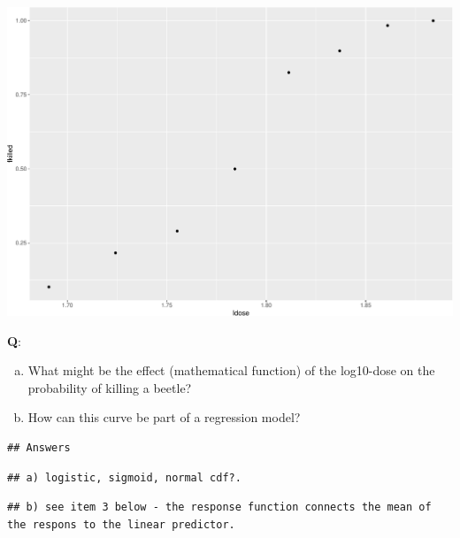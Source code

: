\documentclass[
  ignorenonframetext,
]{beamer}
\newenvironment{Shaded}{\begin{snugshade}}{\end{snugshade}}
\newcommand{\AttributeTok}[1]{\textcolor[rgb]{0.13,0.29,0.53}{#1}}
\newcommand{\CommentTok}[1]{\textcolor[rgb]{0.56,0.35,0.01}{\textit{#1}}}
\newcommand{\FunctionTok}[1]{\textcolor[rgb]{0.13,0.29,0.53}{\textbf{#1}}}
\newcommand{\NormalTok}[1]{#1}
\newcommand{\OtherTok}[1]{\textcolor[rgb]{0.56,0.35,0.01}{#1}}
\newcommand{\SpecialCharTok}[1]{\textcolor[rgb]{0.81,0.36,0.00}{\textbf{#1}}}
\providecommand{\tightlist}{%
  \setlength{\itemsep}{0pt}\setlength{\parskip}{0pt}}
\begin{document}
\begin{frame}[fragile]
\begin{Shaded}
\end{Shaded}

\includegraphics{3BinRegPresentation_files/figure-beamer/unnamed-chunk-2-1.pdf}
\end{frame}

\begin{frame}[fragile]
\textbf{Q}:

\begin{enumerate}
[a.]
\tightlist
\item
  What might be the effect (mathematical function) of the log10-dose on
  the probability of killing a beetle?
\item
  How can this curve be part of a regression model?
\end{enumerate}

\begin{verbatim}
## Answers
\end{verbatim}

\begin{verbatim}
## a) logistic, sigmoid, normal cdf?.
\end{verbatim}

\begin{verbatim}
## b) see item 3 below - the response function connects the mean of the respons to the linear predictor.
\end{verbatim}
\end{frame}
\end{document}
